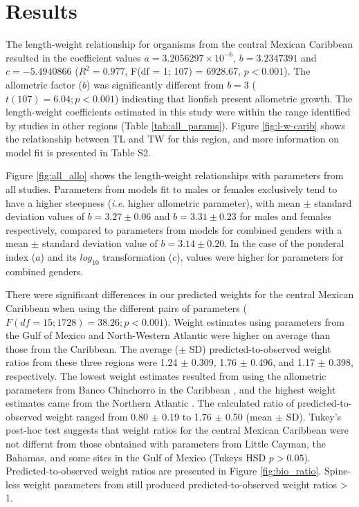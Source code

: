 \documentclass[fleqn,10pt,lineno]{wlpeerj} %
\begin{document}
\section*{Results}

The length-weight relationship for organisms from the central Mexican
Caribbean resulted in the coefficient values
\(a = 3.2056297\times 10^{-6}\), \(b = 3.2347391\) and
\(c = -5.4940866\) (\(R^2 = 0.977\), F(df = 1; 107) = 6928.67,
\(p < 0.001\)). The allometric factor (\(b\)) was significantly
different from \(b = 3\) (\(t(107) = 6.04; p<0.001\)) indicating that
lionfish present allometric growth. The length-weight coefficients
estimated in this study were within the range identified by studies in
other regions (Table \ref{tab:all_params}). Figure \ref{fig:l-w-carib}
shows the relationship between TL and TW for this region, and more
information on model fit is presented in Table S2.

Figure \ref{fig:all_allo} shows the length-weight relationships with
parameters from all studies. Parameters from models fit to males or
females exclusively tend to have a higher steepness (\emph{i.e.} higher
allometric parameter), with mean \(\pm\) standard deviation values of
\(b = 3.27 \pm 0.06\) and \(b = 3.31 \pm 0.23\) for males and females
respectively, compared to parameters from models for combined genders
with a mean \(\pm\) standard deviation value of \(b = 3.14 \pm 0.20\).
In the case of the ponderal index (\(a\)) and its \(log_{10}\)
transformation (\(c\)), values were higher for parameters for combined
genders.

There were significant differences in our predicted weights for the
central Mexican Caribbean when using the different pairs of parameters
(\(F(df = 15; 1728) = 38.26; p < 0.001\)). Weight estimates using
parameters from the Gulf of Mexico and North-Western Atlantic were
higher on average than those from the Caribbean. The average (\(\pm\)
SD) predicted-to-observed weight ratios from these three regions were
1.24 \(\pm\) 0.309, 1.76 \(\pm\) 0.496, and 1.17 \(\pm\) 0.398,
respectively. The lowest weight estimates resulted from using the
allometric parameters from Banco Chinchorro in the Caribbean
\citet{sabidoitz_2016}, and the highest weight estimates came from the
Northern Atlantic \citep{barbour_2011}. The calculated ratio of
predicted-to-observed weight ranged from 0.80 \(\pm\) 0.19 to 1.76
\(\pm\) 0.50 (mean \(\pm\) SD). Tukey's post-hoc test suggests that
weight ratios for the central Mexican Caribbean were not differnt from
those obntained with parameters from Little Cayman, the Bahamas, and
some sites in the Gulf of Mexico (Tukeys HSD \(p > 0.05\)).
Predicted-to-observed weight ratios are presented in Figure
\ref{fig:bio_ratio}. Spine-less weight parameters from \citet{fogg_2013}
still produced predicted-to-observed weight ratios \textgreater{} 1.
\end{document}
